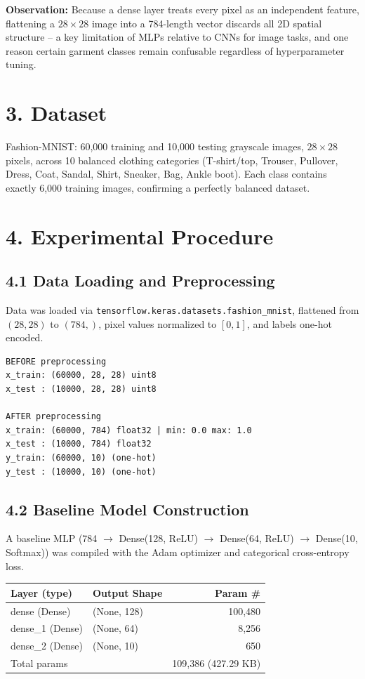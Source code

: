 \documentclass[11pt]{article}
\begin{document}
\textbf{Observation:} Because a dense layer treats every pixel as an independent feature, flattening a $28\times28$ image into a 784-length vector discards all 2D spatial structure -- a key limitation of MLPs relative to CNNs for image tasks, and one reason certain garment classes remain confusable regardless of hyperparameter tuning.

\section*{3. Dataset}
Fashion-MNIST: 60,000 training and 10,000 testing grayscale images, $28\times28$ pixels, across 10 balanced clothing categories (T-shirt/top, Trouser, Pullover, Dress, Coat, Sandal, Shirt, Sneaker, Bag, Ankle boot). Each class contains exactly 6,000 training images, confirming a perfectly balanced dataset.

\section*{4. Experimental Procedure}

\subsection*{4.1 Data Loading and Preprocessing}
Data was loaded via \texttt{tensorflow.keras.datasets.fashion\_mnist}, flattened from $(28,28)$ to $(784,)$, pixel values normalized to $[0,1]$, and labels one-hot encoded.

\begin{verbatim}
BEFORE preprocessing
x_train: (60000, 28, 28) uint8
x_test : (10000, 28, 28) uint8

AFTER preprocessing
x_train: (60000, 784) float32 | min: 0.0 max: 1.0
x_test : (10000, 784) float32
y_train: (60000, 10) (one-hot)
y_test : (10000, 10) (one-hot)
\end{verbatim}

\subsection*{4.2 Baseline Model Construction}
A baseline MLP (784 $\rightarrow$ Dense(128, ReLU) $\rightarrow$ Dense(64, ReLU) $\rightarrow$ Dense(10, Softmax)) was compiled with the Adam optimizer and categorical cross-entropy loss.

\begin{center}
\begin{tabular}{|l|l|r|}
\hline
\textbf{Layer (type)} & \textbf{Output Shape} & \textbf{Param \#} \\
\hline
dense (Dense) & (None, 128) & 100,480 \\
dense\_1 (Dense) & (None, 64) & 8,256 \\
dense\_2 (Dense) & (None, 10) & 650 \\
\hline
\multicolumn{2}{|l|}{Total params} & 109,386 (427.29 KB) \\
\hline
\end{tabular}
\end{center}
\end{document}
